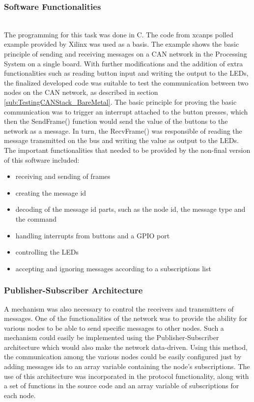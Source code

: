 \subsubsection{Software Functionalities}~\\
\label{sub:Basic_SourceCode}
The programming for this task was done in C.
The code from xcanps polled example provided by Xilinx was used as a basis.
The example shows the basic principle of sending and receiving messages on a CAN network in the Processing System on a single board.
With further modifications and the addition of extra functionalities such as reading button input and writing the output to the LEDs, the finalized developed code was suitable to test the communication between two nodes on the CAN network, as described in section \ref{sub:TestingCANStack_BareMetal}.
The basic principle for proving the basic communication was to trigger an interrupt attached to the button presses, which then the SendFrame() function would send the value of the buttons to the network as a message.
In turn, the RecvFrame() was responsible of reading the message transmitted on the bus and writing the value as output to the LEDs.
The important functionalities that needed to be provided by the non-final version of this software included:
\begin{itemize}
\item receiving and sending of frames
\item creating the message id
\item decoding of the message id parts, such as the node id, the message type and the command
\item handling interrupts from buttons and a GPIO port
\item controlling the LEDs
\item accepting and ignoring messages according to a subscriptions list
\end{itemize}

\subsubsection{Publisher-Subscriber Architecture}
A mechanism was also necessary to control the receivers and transmitters of messages.
One of the functionalities of the network was to provide the ability for various nodes to be able to send specific messages to other nodes.
Such a mechanism could easily be implemented using the Publisher-Subscriber architecture which would also make the network data-driven.
Using this method, the communication among the various nodes could be easily configured just by adding messages ids to an array variable containing the node's subscriptions.
The use of this architecture was incorporated in the protocol functionality, along with a set of functions in the source code and an array variable of subscriptions for each node.

